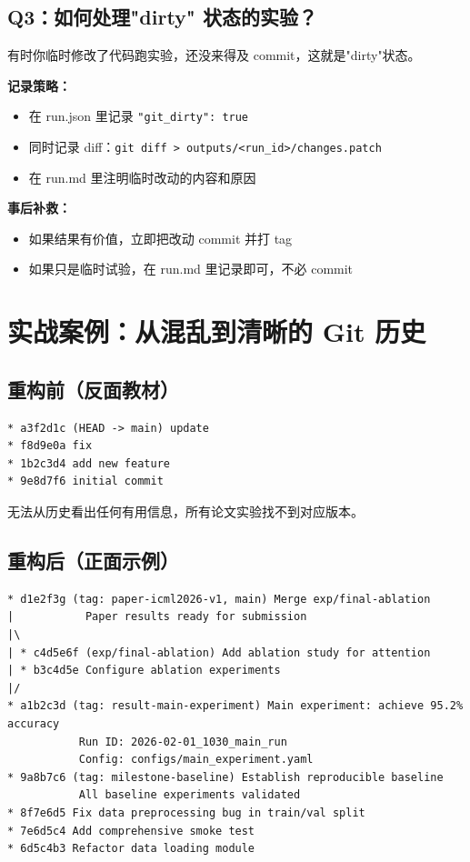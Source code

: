 \subsection{Q3：如何处理"dirty" 状态的实验？}

有时你临时修改了代码跑实验，还没来得及 commit，这就是"dirty"状态。

\textbf{记录策略：}
\begin{itemize}
  \item 在 run.json 里记录 \texttt{"git\_dirty": true}
  \item 同时记录 diff：\texttt{git diff > outputs/<run\_id>/changes.patch}
  \item 在 run.md 里注明临时改动的内容和原因
\end{itemize}

\textbf{事后补救：}
\begin{itemize}
  \item 如果结果有价值，立即把改动 commit 并打 tag
  \item 如果只是临时试验，在 run.md 里记录即可，不必 commit
\end{itemize}

\section{实战案例：从混乱到清晰的 Git 历史}

\subsection{重构前（反面教材）}

\begin{verbatim}
* a3f2d1c (HEAD -> main) update
* f8d9e0a fix
* 1b2c3d4 add new feature
* 9e8d7f6 initial commit
\end{verbatim}

无法从历史看出任何有用信息，所有论文实验找不到对应版本。

\subsection{重构后（正面示例）}

\begin{verbatim}
* d1e2f3g (tag: paper-icml2026-v1, main) Merge exp/final-ablation
|           Paper results ready for submission
|\
| * c4d5e6f (exp/final-ablation) Add ablation study for attention
| * b3c4d5e Configure ablation experiments
|/
* a1b2c3d (tag: result-main-experiment) Main experiment: achieve 95.2% accuracy
           Run ID: 2026-02-01_1030_main_run
           Config: configs/main_experiment.yaml
* 9a8b7c6 (tag: milestone-baseline) Establish reproducible baseline
           All baseline experiments validated
* 8f7e6d5 Fix data preprocessing bug in train/val split
* 7e6d5c4 Add comprehensive smoke test
* 6d5c4b3 Refactor data loading module
\end{verbatim}

